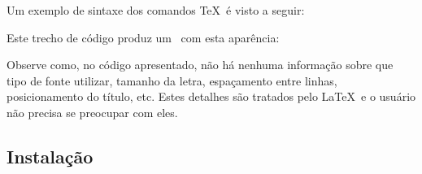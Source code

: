 Um exemplo de sintaxe dos comandos \TeX\ é visto a seguir:


Este trecho de código produz um \pdf\ com esta aparência:

\noindent{}

Observe como, no código apresentado, não há nenhuma informação sobre que tipo de fonte utilizar, tamanho da letra, espaçamento entre linhas, posicionamento do título, etc. Estes detalhes são tratados pelo \LaTeX\ e o usuário não precisa se preocupar com eles.

\subsection{Instalação}
